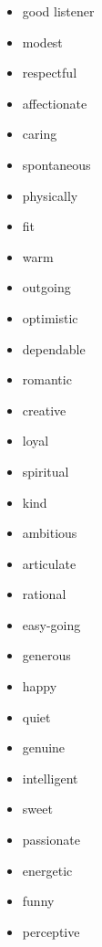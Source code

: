 \begin{appendices}
\begin{itemize}
\begin{enumerate}
			\begin{itemize}
				\item good listener 
				\item modest
				\item respectful
				\item affectionate
				\item caring
				\item spontaneous
				\item physically
				\item fit
				\item warm
				\item outgoing
				\item optimistic
				\item dependable
				\item romantic
				\item creative
				\item loyal
				\item spiritual
				\item kind
				\item ambitious
				\item articulate
				\item rational
				\item easy-going
				\item generous
				\item happy
				\item quiet
				\item genuine
				\item intelligent
				\item sweet
				\item passionate
				\item energetic
				\item funny
				\item perceptive
			\end{itemize}
		\end{enumerate}
	\end{itemize}
	\begin{lstlisting}[language=python]


	
	\end{lstlisting}
\end{appendices}
